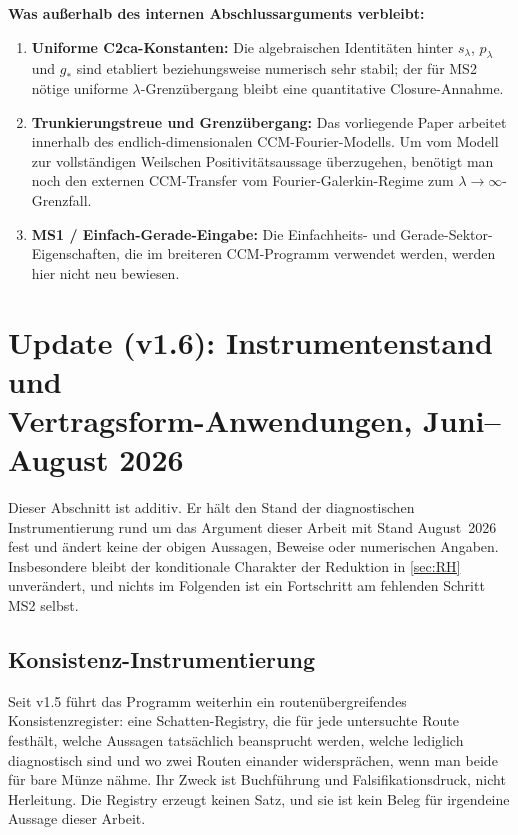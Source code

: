 \documentclass[12pt,a4paper]{article}
\theoremstyle{definition}
\theoremstyle{remark}
\begin{document}
\noindent\textbf{Was außerhalb des internen Abschlussarguments verbleibt:}
\begin{enumerate}[label=(O\arabic*)]
\item \textbf{Uniforme C2ca-Konstanten:} Die algebraischen Identitäten hinter
  $s_\lambda$, $p_\lambda$ und $g_*$ sind etabliert beziehungsweise numerisch
  sehr stabil; der für MS2 nötige uniforme $\lambda$-Grenzübergang bleibt eine
  quantitative Closure-Annahme.
\item \textbf{Trunkierungstreue und Grenzübergang:} Das vorliegende
  Paper arbeitet innerhalb des endlich-dimensionalen CCM-Fourier-Modells.
  Um vom Modell zur vollständigen Weilschen Positivitätsaussage
  überzugehen, benötigt man noch den externen CCM-Transfer vom
  Fourier-Galerkin-Regime zum $\lambda\to\infty$-Grenzfall.
\item \textbf{MS1 / Einfach-Gerade-Eingabe:} Die Einfachheits- und
  Gerade-Sektor-Eigenschaften, die im breiteren CCM-Programm verwendet
  werden, werden hier nicht neu bewiesen.
\end{enumerate}

\bigskip

\section[Update (v1.6): Instrumentenstand und Vertragsform-Anwendungen,
Juni--August 2026]%
{Update (v1.6): Instrumentenstand und\\
Vertragsform-Anwendungen, Juni--August 2026}
\label{sec:update-v16}

Dieser Abschnitt ist additiv.  Er hält den Stand der diagnostischen
Instrumentierung rund um das Argument dieser Arbeit mit Stand
August~2026 fest und ändert keine der obigen Aussagen, Beweise oder
numerischen Angaben.  Insbesondere bleibt der konditionale Charakter der
Reduktion in \cref{sec:RH} unverändert, und nichts im Folgenden ist ein
Fortschritt am fehlenden Schritt MS2 selbst.

\subsection{Konsistenz-Instrumentierung}

Seit v1.5 führt das Programm weiterhin ein routenübergreifendes
Konsistenzregister: eine Schatten-Registry, die für jede untersuchte
Route festhält, welche Aussagen tatsächlich beansprucht werden, welche
lediglich diagnostisch sind und wo zwei Routen einander widersprächen,
wenn man beide für bare Münze nähme.  Ihr Zweck ist Buchführung und
Falsifikationsdruck, nicht Herleitung.  Die Registry erzeugt keinen
Satz, und sie ist kein Beleg für irgendeine Aussage dieser Arbeit.
\end{document}
